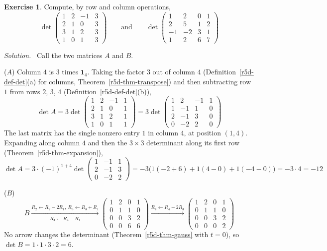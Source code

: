 \documentclass[12pt]{article}
\newcommand{\one}{\mathbf 1}
\theoremstyle{definition}
\newtheorem{exercise}{Exercise}
\newenvironment{solution}{\par\noindent\textit{Solution.}\ }{\par\smallskip}
\begin{document}
\begin{exercise}\label{r5d-ex-two-dets}
Compute, by row and column operations,
\[
\det\begin{pmatrix}1&2&-1&3\\2&1&0&3\\3&1&2&3\\1&0&1&3\end{pmatrix}\qquad\text{and}\qquad
\det\begin{pmatrix}1&2&0&1\\2&5&1&2\\-1&-2&3&1\\1&2&6&7\end{pmatrix}
\]
\end{exercise}
\begin{solution}
Call the two matrices \(A\) and \(B\).

(\(A\)) Column \(4\) is \(3\) times \(\one_4\). Taking the factor \(3\) out of column \(4\)
(Definition~\ref{r5d-def-det}(a) for columns, Theorem~\ref{r5d-thm-transpose}) and then subtracting row \(1\)
from rows \(2\), \(3\), \(4\) (Definition~\ref{r5d-def-det}(b)),
\[
\det A=3\det\begin{pmatrix}1&2&-1&1\\2&1&0&1\\3&1&2&1\\1&0&1&1\end{pmatrix}
=3\det\begin{pmatrix}1&2&-1&1\\1&-1&1&0\\2&-1&3&0\\0&-2&2&0\end{pmatrix}
\]
The last matrix has the single nonzero entry \(1\) in column \(4\), at position \((1,4)\). Expanding
along column \(4\) and then the \(3\times3\) determinant along its first row (Theorem~\ref{r5d-thm-expansion}),
\[
\det A=3\cdot(-1)^{1+4}\det\begin{pmatrix}1&-1&1\\2&-1&3\\0&-2&2\end{pmatrix}
=-3\bigl(1(-2+6)+1(4-0)+1(-4-0)\bigr)=-3\cdot4=-12
\]

(\(B\))
\[
B\xrightarrow[R_4\leftarrow R_4-R_1]{R_2\leftarrow R_2-2R_1,\ R_3\leftarrow R_3+R_1}
\begin{pmatrix}1&2&0&1\\0&1&1&0\\0&0&3&2\\0&0&6&6\end{pmatrix}
\xrightarrow{R_4\leftarrow R_4-2R_3}
\begin{pmatrix}1&2&0&1\\0&1&1&0\\0&0&3&2\\0&0&0&2\end{pmatrix}
\]
No arrow changes the determinant (Theorem~\ref{r5d-thm-gauss} with \(t=0\)), so \(\det B=1\cdot1\cdot3\cdot2=6\).
\end{solution}
\end{document}
